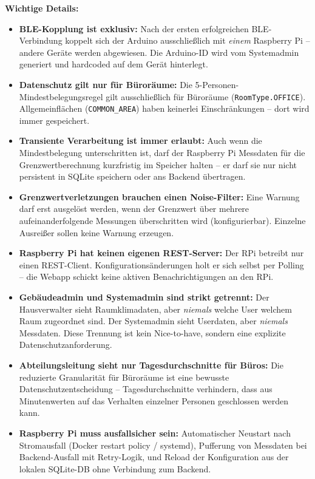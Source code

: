 \documentclass[12pt,a4paper]{article}
\begin{document}
\textbf{Wichtige Details:}
\begin{itemize}
	\item \textbf{BLE-Kopplung ist exklusiv:} Nach der ersten erfolgreichen BLE-Verbindung
	koppelt sich der Arduino ausschließlich mit \emph{einem} Raspberry Pi -- andere
	Geräte werden abgewiesen. Die Arduino-ID wird vom Systemadmin generiert und
	hardcoded auf dem Gerät hinterlegt.
	
	\item \textbf{Datenschutz gilt nur für Büroräume:} Die 5-Personen-Mindestbelegungsregel
	gilt ausschließlich für Büroräume (\texttt{RoomType.OFFICE}). Allgemeinflächen
	(\texttt{COMMON\_AREA}) haben keinerlei Einschränkungen -- dort wird immer gespeichert.
	
	\item \textbf{Transiente Verarbeitung ist immer erlaubt:} Auch wenn die Mindestbelegung
	unterschritten ist, darf der Raspberry Pi Messdaten für die Grenzwertberechnung
	kurzfristig im Speicher halten -- er darf sie nur nicht persistent in SQLite speichern
	oder ans Backend übertragen.
	
	\item \textbf{Grenzwertverletzungen brauchen einen Noise-Filter:} Eine Warnung darf
	erst ausgelöst werden, wenn der Grenzwert über mehrere aufeinanderfolgende Messungen
	überschritten wird (konfigurierbar). Einzelne Ausreißer sollen keine Warnung erzeugen.
	
	\item \textbf{Raspberry Pi hat keinen eigenen REST-Server:} Der RPi betreibt nur einen
	REST-Client. Konfigurationsänderungen holt er sich selbst per Polling -- die Webapp
	schickt keine aktiven Benachrichtigungen an den RPi.
	
	\item \textbf{Gebäudeadmin und Systemadmin sind strikt getrennt:} Der Hausverwalter
	sieht Raumklimadaten, aber \emph{niemals} welche User welchem Raum zugeordnet sind.
	Der Systemadmin sieht Userdaten, aber \emph{niemals} Messdaten. Diese Trennung ist
	kein Nice-to-have, sondern eine explizite Datenschutzanforderung.
	
	\item \textbf{Abteilungsleitung sieht nur Tagesdurchschnitte für Büros:} Die reduzierte
	Granularität für Büroräume ist eine bewusste Datenschutzentscheidung -- Tagesdurchschnitte
	verhindern, dass aus Minutenwerten auf das Verhalten einzelner Personen geschlossen
	werden kann.
	
	\item \textbf{Raspberry Pi muss ausfallsicher sein:} Automatischer Neustart nach
	Stromausfall (Docker restart policy / systemd), Pufferung von Messdaten bei
	Backend-Ausfall mit Retry-Logik, und Reload der Konfiguration aus der lokalen
	SQLite-DB ohne Verbindung zum Backend.
	

\end{itemize}
\end{document}
